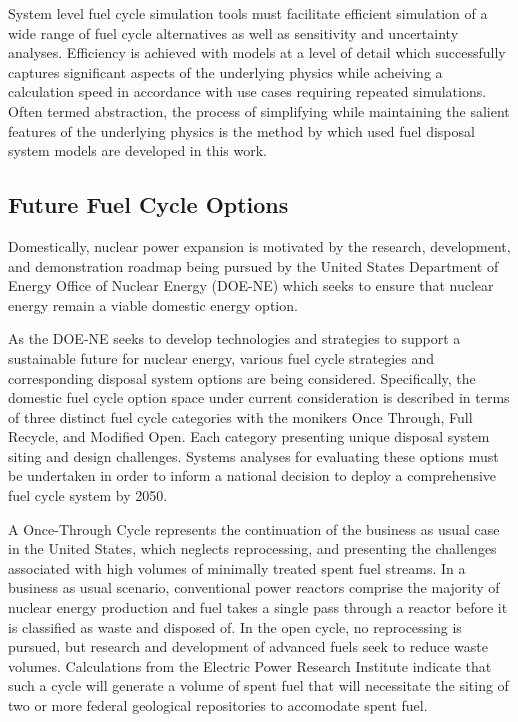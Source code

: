 System level fuel cycle simulation tools must facilitate efficient 
simulation of a wide range of fuel cycle alternatives as well as 
sensitivity and uncertainty analyses. Efficiency is achieved with 
models at a level of detail which successfully captures significant 
aspects of the underlying physics while acheiving a calculation speed 
in accordance with use cases requiring repeated simulations. Often 
termed abstraction, the process of simplifying while maintaining the 
salient features of the underlying physics is the method by which used 
fuel disposal system models are developed in this work. 

\subsection{Future Fuel Cycle Options}

Domestically, nuclear power expansion is motivated by the research, 
development, and demonstration roadmap being pursued by the United 
States Department of Energy Office of Nuclear Energy (DOE-NE) which 
seeks to ensure that nuclear energy remain a viable domestic energy 
option.  \cite{department_of_energy_-_nuclear_energy_nuclear_2010} 

As the DOE-NE seeks to develop technologies and strategies to support 
a sustainable future for nuclear energy, various fuel cycle strategies 
and corresponding disposal system options are being considered.  
Specifically, the domestic fuel cycle option space under current 
consideration is described in terms of three distinct fuel cycle 
categories with the monikers Once Through, Full Recycle, and Modified 
Open. Each category presenting unique disposal system siting and 
design challenges. Systems analyses for evaluating these options must 
be undertaken in order to inform a national decision to deploy a 
comprehensive fuel cycle system by 2050.  
\cite{department_of_energy_-_nuclear_energy_nuclear_2010} 

A Once-Through Cycle represents the continuation of the business as 
usual case in the United States, which neglects reprocessing, and 
presenting the challenges associated with high volumes of minimally 
treated spent fuel streams.  In a business as usual scenario, 
conventional power reactors comprise the majority of nuclear energy 
production and fuel takes a single pass through a reactor before it is 
classified as waste and disposed of. In the open cycle, no 
reprocessing is pursued, but research and development of advanced 
fuels seek to reduce waste volumes. Calculations from the Electric 
Power Research Institute indicate that such a cycle will generate a 
volume of spent fuel that will necessitate the siting of two or more 
federal  geological repositories to accomodate spent fuel.  
\cite{kessler_room_2006}  %

